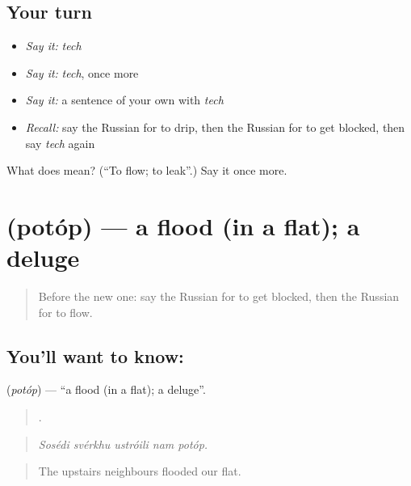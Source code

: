 \subsection*{Your turn}
\begin{itemize}
\raggedright
  \item \emph{Say it:} \emph{tech}
  \item \emph{Say it:} \emph{tech}, once more
  \item \emph{Say it:} a sentence of your own with \emph{tech}
  \item \emph{Recall:} say the Russian for to drip, then the Russian for to get blocked, then say \emph{tech} again
\end{itemize}

\begin{tcolorbox}[breakable,colback=teal!4,colframe=teal!35!black,title={Before you move on}]
What does  mean? (\textquotedblleft{}To flow; to leak\textquotedblright{}.) Say it once more.
\end{tcolorbox}
\section[\texorpdfstring{\ru{потоп} (potóp)}{потоп (potóp)}]{ (potóp) — a flood (in a flat); a deluge}

\label{lesson:RU-C432-potop}



\begin{quote}
Before the new one: say the Russian for to get blocked, then the Russian for to flow.
\end{quote}

\subsection*{You'll want to know: }
\textbf{} (\emph{potóp}) — \textquotedblleft{}a flood (in a flat); a deluge\textquotedblright{}.

\begin{quote}
    .
\end{quote}

\begin{quote}
\emph{Sosédi svérkhu ustróili nam potóp.}
\end{quote}

\begin{quote}
The upstairs neighbours flooded our flat.
\end{quote}

